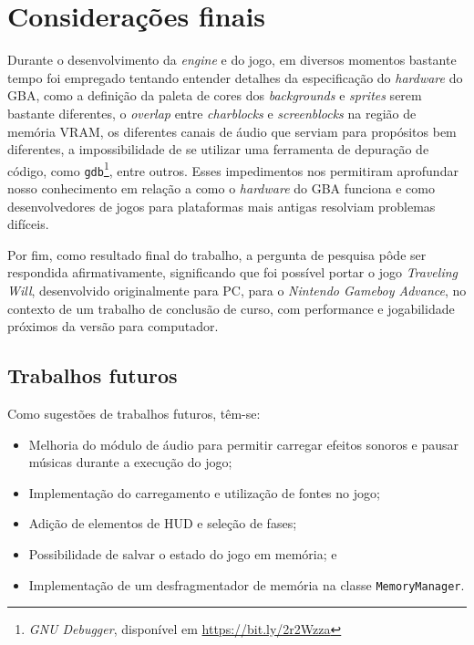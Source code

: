\chapter[Considerações finais]{Considerações finais}

Durante o desenvolvimento da \textit{engine} e do jogo, em diversos momentos bastante tempo foi empregado tentando entender detalhes da especificação do \textit{hardware} do GBA, como a definição da paleta de cores dos \textit{backgrounds} e \textit{sprites} serem bastante diferentes, o \textit{overlap} entre \textit{charblocks} e \textit{screenblocks} na região de memória VRAM, os diferentes canais de áudio que serviam para propósitos bem diferentes, a impossibilidade de se utilizar uma ferramenta de depuração de código, como \texttt{gdb}\footnote{\textit{GNU Debugger}, disponível em \url{https://bit.ly/2r2Wzza}}, entre outros. Esses impedimentos nos permitiram aprofundar nosso conhecimento em relação a como o \textit{hardware} do GBA funciona e como desenvolvedores de jogos para plataformas mais antigas resolviam problemas difíceis.

Por fim, como resultado final do trabalho, a pergunta de pesquisa pôde ser respondida afirmativamente, significando que foi possível portar o jogo \textit{Traveling Will}, desenvolvido originalmente para PC, para o \textit{Nintendo Gameboy Advance}, no contexto de um trabalho de conclusão de curso, com performance e jogabilidade próximos da versão para computador.

\section{Trabalhos futuros}

  Como sugestões de trabalhos futuros, têm-se:

  \begin{itemize}
    \item Melhoria do módulo de áudio para permitir carregar efeitos sonoros e pausar músicas durante a execução do jogo;
    \item Implementação do carregamento e utilização de fontes no jogo;
    \item Adição de elementos de HUD e seleção de fases;
    \item Possibilidade de salvar o estado do jogo em memória; e
    \item Implementação de um desfragmentador de memória na classe \texttt{MemoryManager}.
  \end{itemize}